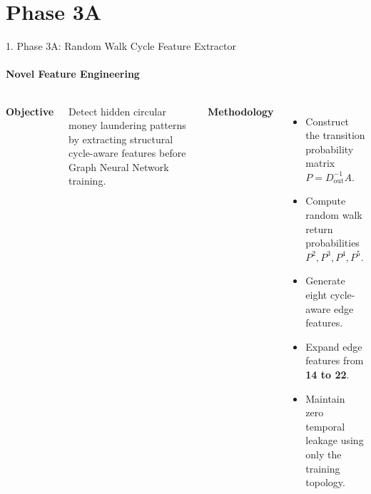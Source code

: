 \documentclass[aspectratio=169,11pt]{beamer}
\begin{document}

\section{Phase 3A}

\begin{frame}{1. Phase 3A: Random Walk Cycle Feature Extractor}

\framesubtitle{Novel Feature Engineering}

\begin{columns}[T]


{\footnotesize
\textbf{Objective}

Detect hidden circular money laundering patterns by extracting structural cycle-aware features before Graph Neural Network training.

\vspace{0.15cm}

\textbf{Methodology}

\begin{itemize}\setlength{\itemsep}{2.5pt}\setlength{\parskip}{0pt}

\item Construct the transition probability matrix
$P = D_{\mathrm{out}}^{-1} A$.

\item Compute random walk return probabilities
$P^2, P^3, P^4, P^5$.

\item Generate eight cycle-aware edge features.

\item Expand edge features from \textbf{14 to 22}.

\item Maintain zero temporal leakage using only the training topology.

\end{itemize}
}


\centering

\begin{tikzpicture}[
node distance=0.25cm,
every node/.style={
draw,
rounded corners,
minimum width=3.3cm,
minimum height=0.50cm,
align=center,
font=\scriptsize,
inner sep=2.5pt}
]


\end{tikzpicture}
\end{columns}
\end{frame}
\end{document}
